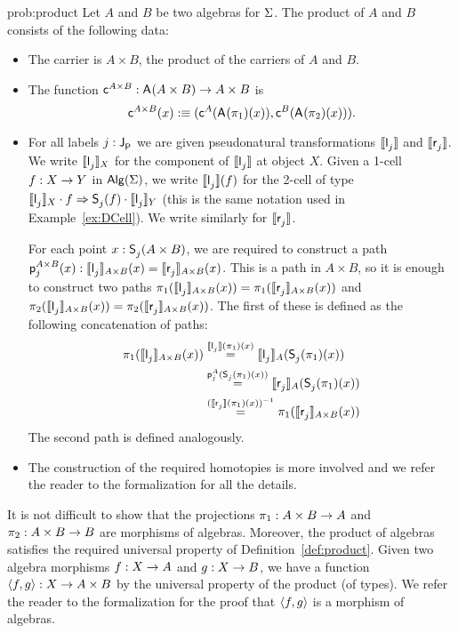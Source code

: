 \begin{construction}{prob:product}\label{cons:product}
Let $A$ and $B$ be two algebras for $\Sigma$. The product of $A$ and
$B$ consists of the following data:
\begin{itemize}
\item The carrier is $A \times B$, the product of the carriers of $A$ and $B$.
\item The function $\mathsf{c}^{A \times B} : \mathsf{A}^{}(A \times B) \rightarrow A \times B$ is
\[
\mathsf{c}^{A \times B}(x) :\equiv (\mathsf{c}^{A}(\mathsf{A}^{}(\pi_1)(x)),\mathsf{c}^{B}(\mathsf{A}^{}(\pi_2)(x))).
\]
\item For all labels $j : \mathsf{J}^{}_{\mathsf{P}}$ we are given pseudonatural
transformations $\llbracket \mathsf{l}^{}_j \rrbracket$ and $\llbracket \mathsf{r}^{}_j \rrbracket$. We
write $\llbracket \mathsf{l}^{}_j \rrbracket_X$ for the component of $\llbracket \mathsf{l}^{}_j \rrbracket$
at object $X$. Given a
1-cell $f : X \rightarrow Y$ in $\mathsf{Alg}(\Sigma)$, we write
$\llbracket \mathsf{l}^{}_j \rrbracket(f)$ for the 2-cell of type
$\llbracket \mathsf{l}^{}_j \rrbracket_X \cdot
f \Rightarrow \mathsf{S}^{}_j(f) \cdot \llbracket \mathsf{l}^{}_j \rrbracket_Y$ (this is the same notation used in Example~\ref{ex:DCell}).
We write similarly for $\llbracket \mathsf{r}^{}_j \rrbracket$.

For each point $x : \mathsf{S}^{}_j(A \times B)$, we are required
to construct a path $\mathsf{p}^{A \times B}_{j}(x)
: \llbracket \mathsf{l}^{}_j \rrbracket_{A \times B}(x) = \llbracket \mathsf{r}^{}_j \rrbracket_{A \times
B}(x)$. This is a path in $A \times B$, so it is enough to construct
two paths $\pi_1(\llbracket \mathsf{l}^{}_j \rrbracket_{A \times B}(x))
= \pi_1(\llbracket \mathsf{r}^{}_j \rrbracket_{A \times B}(x))$ and
$\pi_2(\llbracket \mathsf{l}^{}_j \rrbracket_{A \times B}(x))
= \pi_2(\llbracket \mathsf{r}^{}_j \rrbracket_{A \times B}(x))$. The first of these is
defined as the following concatenation of paths:
\begin{align*}
\pi_1(\llbracket \mathsf{l}^{}_j \rrbracket_{A \times B}(x))
&\stackrel{\llbracket \mathsf{l}^{}_j \rrbracket(\pi_1)(x)}{=}
\llbracket \mathsf{l}^{}_j \rrbracket_{A}(\mathsf{S}^{}_j(\pi_1)(x)) \\
&\stackrel{\mathsf{p}^{A}_{j}(\mathsf{S}^{}_j(\pi_1)(x))}{=}
\llbracket \mathsf{r}^{}_j \rrbracket_{A}(\mathsf{S}^{}_j(\pi_1)(x)) \\
&\stackrel{(\llbracket \mathsf{r}^{}_j \rrbracket(\pi_1)(x))^{-1}}{=}
\pi_1(\llbracket \mathsf{r}^{}_j \rrbracket_{A \times B}(x))
\end{align*}
The second path is defined analogously.
\item The construction of the required homotopies is more involved and we refer the reader to the formalization for all the details.
\end{itemize}

It is not difficult to show that the projections $\pi_1 : A \times B \rightarrow A$ and $\pi_2 : A \times B \rightarrow B$ are morphisms of
algebras.  Moreover, the product of algebras satisfies the required
universal property of Definition~\ref{def:product}. Given
two algebra morphisms $f : X \rightarrow A$ and $g : X \rightarrow B$, we
have a function $\langle f , g \rangle : X \to A \times B$ by the universal
property of the product (of types). We refer the reader to the formalization for the proof that
$\langle f , g \rangle$ is  a morphism of algebras. 
\end{construction}

